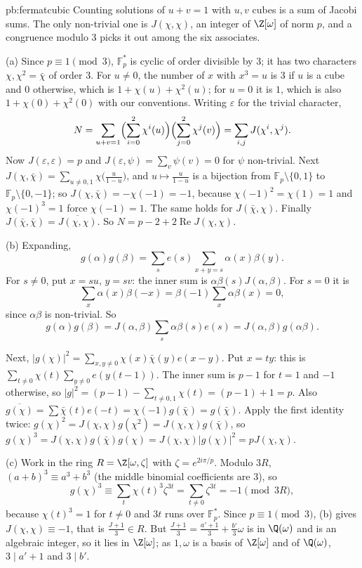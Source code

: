 \begin{solution}{pb:fermatcubic}
\idea Counting solutions of $u+v=1$ with $u,v$ cubes is a sum of Jacobi sums. The only non-trivial one is $J(\chi,\chi)$, an
integer of $\Z[\omega]$ of norm $p$, and a congruence modulo $3$ picks it out among the six associates.

\writeup (a) Since $p\equiv1\pmod 3$, $\mathbb F_p^*$ is cyclic of order divisible by $3$; it has two characters $\chi,\chi^2=\bar\chi$
of order $3$. For $u\ne0$, the number of $x$ with $x^3=u$ is $3$ if $u$ is a cube and $0$ otherwise, which is $1+\chi(u)+\chi^2(u)$;
for $u=0$ it is $1$, which is also $1+\chi(0)+\chi^2(0)$ with our conventions. Writing $\varepsilon$ for the trivial character,
\[
N=\sum_{u+v=1}\Bigl(\sum_{i=0}^2\chi^i(u)\Bigr)\Bigl(\sum_{j=0}^2\chi^j(v)\Bigr)=\sum_{i,j}J(\chi^i,\chi^j).
\]
Now $J(\varepsilon,\varepsilon)=p$ and $J(\varepsilon,\psi)=\sum_v\psi(v)=0$ for $\psi$ non-trivial. Next
$J(\chi,\bar\chi)=\sum_{u\ne0,1}\chi\bigl(\frac u{1-u}\bigr)$, and $u\mapsto\frac u{1-u}$ is a bijection from
$\mathbb F_p\setminus\{0,1\}$ to $\mathbb F_p\setminus\{0,-1\}$; so $J(\chi,\bar\chi)=-\chi(-1)=-1$, because
$\chi(-1)^2=\chi(1)=1$ and $\chi(-1)^3=1$ force $\chi(-1)=1$. The same holds for $J(\bar\chi,\chi)$. Finally
$J(\bar\chi,\bar\chi)=\overline{J(\chi,\chi)}$. So $N=p-2+2\operatorname{Re}J(\chi,\chi)$.

(b) Expanding,
\[
g(\alpha)g(\beta)=\sum_s e(s)\sum_{x+y=s}\alpha(x)\beta(y).
\]
For $s\ne0$, put $x=su$, $y=sv$: the inner sum is $\alpha\beta(s)J(\alpha,\beta)$. For $s=0$ it is
\[
\sum_x\alpha(x)\beta(-x)=\beta(-1)\sum_x\alpha\beta(x)=0,
\]
since $\alpha\beta$ is non-trivial. So
\[
g(\alpha)g(\beta)=J(\alpha,\beta)\sum_s\alpha\beta(s)e(s)=J(\alpha,\beta)g(\alpha\beta).
\]

Next, $|g(\chi)|^2=\sum_{x,y\ne0}\chi(x)\bar\chi(y)e(x-y)$. Put $x=ty$: this is
$\sum_{t\ne0}\chi(t)\sum_{y\ne0}e(y(t-1))$. The inner sum is $p-1$ for $t=1$ and $-1$ otherwise, so
$|g|^2=(p-1)-\sum_{t\ne0,1}\chi(t)=(p-1)+1=p$. Also $\overline{g(\chi)}=\sum\bar\chi(t)e(-t)=\chi(-1)g(\bar\chi)=g(\bar\chi)$.
Apply the first identity twice: $g(\chi)^2=J(\chi,\chi)g(\chi^2)=J(\chi,\chi)g(\bar\chi)$, so
$g(\chi)^3=J(\chi,\chi)g(\bar\chi)g(\chi)=J(\chi,\chi)|g(\chi)|^2=pJ(\chi,\chi)$.

(c) Work in the ring $R=\Z[\omega,\zeta]$ with $\zeta=e^{2i\pi/p}$. Modulo $3R$, $(a+b)^3\equiv a^3+b^3$ (the middle binomial
coefficients are $3$), so
\[
g(\chi)^3\equiv\sum_t\chi(t)^3\zeta^{3t}=\sum_{t\ne0}\zeta^{3t}=-1\pmod{3R},
\]
because $\chi(t)^3=1$ for $t\ne0$ and $3t$ runs over $\mathbb F_p^*$. Since $p\equiv1\pmod3$, (b) gives $J(\chi,\chi)\equiv-1$,
that is $\frac{J+1}3\in R$. But $\frac{J+1}3=\frac{a'+1}3+\frac{b'}3\omega$ is in $\Q(\omega)$ and is an algebraic integer, so it lies
in $\Z[\omega]$; as $1,\omega$ is a basis of $\Z[\omega]$ and of $\Q(\omega)$, $3\mid a'+1$ and $3\mid b'$.


\end{solution}
